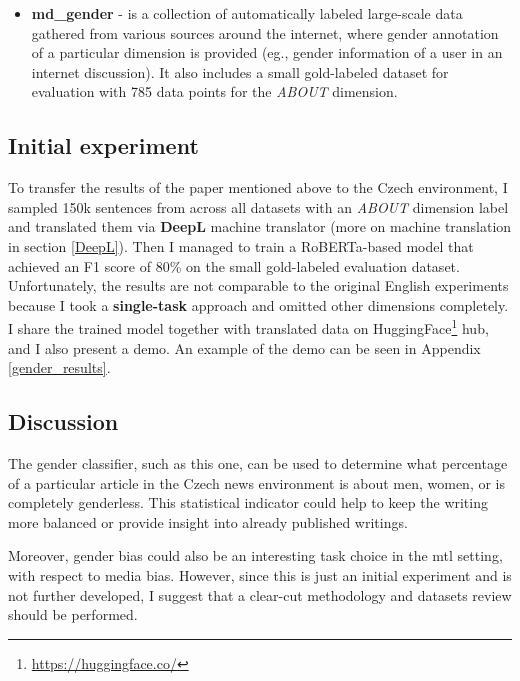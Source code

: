 \newpage

\begin{itemize}
\item \textbf{md\_gender} - is a collection of automatically labeled large-scale data gathered from various sources around the internet, where gender annotation of a particular dimension is provided (eg., gender information of a user in an internet discussion). It also includes a small gold-labeled dataset for evaluation with 785 data points for the \textit{ABOUT} dimension.
\end{itemize}

\subsection{Initial experiment}
To transfer the results of the paper mentioned above to the Czech environment, I sampled 150k sentences from across all datasets with an \textit{ABOUT} dimension label and translated them via \textbf{DeepL} machine translator (more on machine translation in section \ref{DeepL}). Then I managed to train a RoBERTa-based model \cite{liu2019roberta} that achieved an F1 score of 80\% on the small gold-labeled evaluation dataset. 
Unfortunately, the results are not comparable to the original English experiments because I took a \textbf{single-task} approach and omitted other dimensions completely. I share the trained model together with translated data on HuggingFace\footnote{\url{https://huggingface.co/}} hub, and I also present a demo. An example of the demo can be seen in Appendix \ref{gender_results}.


\subsection{Discussion}
The gender classifier, such as this one, can be used to determine what percentage of a particular article in the Czech news environment is about men, women, or is completely genderless. This statistical indicator could help to keep the writing more balanced or provide insight into already published writings.

Moreover, gender bias could also be an interesting task choice in the \gls{mtl} setting, with respect to media bias. However, since this is just an initial experiment and is not further developed, I suggest that a clear-cut methodology and datasets review should be performed. 




